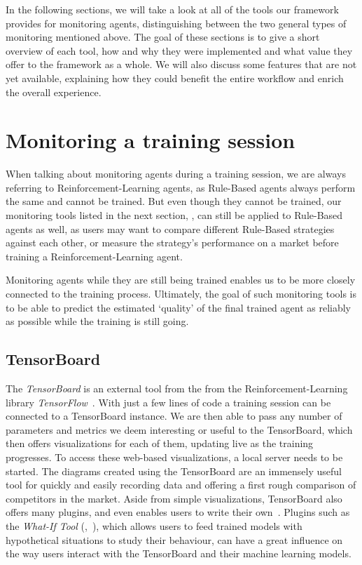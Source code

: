 In the following sections, we will take a look at all of the tools our framework provides for monitoring agents, distinguishing between the two general types of monitoring mentioned above. The goal of these sections is to give a short overview of each tool, how and why they were implemented and what value they offer to the framework as a whole. We will also discuss some features that are not yet available, explaining how they could benefit the entire workflow and enrich the overall experience.

\section{Monitoring a training session}

When talking about monitoring agents during a training session, we are always referring to Reinforcement-Learning agents, as Rule-Based agents always perform the same and cannot be trained. But even though they cannot be trained, our monitoring tools listed in the next section, , can still be applied to Rule-Based agents as well, as users may want to compare different Rule-Based strategies against each other, or measure the strategy's performance on a market before training a Reinforcement-Learning agent.

Monitoring agents while they are still being trained enables us to be more closely connected to the training process. Ultimately, the goal of such monitoring tools is to be able to predict the estimated `quality' of the final trained agent as reliably as possible while the training is still going.

\subsection*{TensorBoard}\label{subsec:TensorBoard}

The \emph{TensorBoard} is an external tool from the from the Reinforcement-Learning library \emph{TensorFlow}~\cite{TensorFlow}. With just a few lines of code a training session can be connected to a TensorBoard instance. We are then able to pass any number of parameters and metrics we deem interesting or useful to the TensorBoard, which then offers visualizations for each of them, updating live as the training progresses. To access these web-based visualizations, a local server needs to be started. The diagrams created using the TensorBoard are an immensely useful tool for quickly and easily recording data and offering a first rough comparison of competitors in the market. Aside from simple visualizations, TensorBoard also offers many plugins, and even enables users to write their own~\cite{TensorBoardPlugins}. Plugins such as the \emph{What-If Tool} (\cite{WhatIfTool},~\cite{WhatIfToolWeb}), which allows users to feed trained models with hypothetical situations to study their behaviour, can have a great influence on the way users interact with the TensorBoard and their machine learning models.


